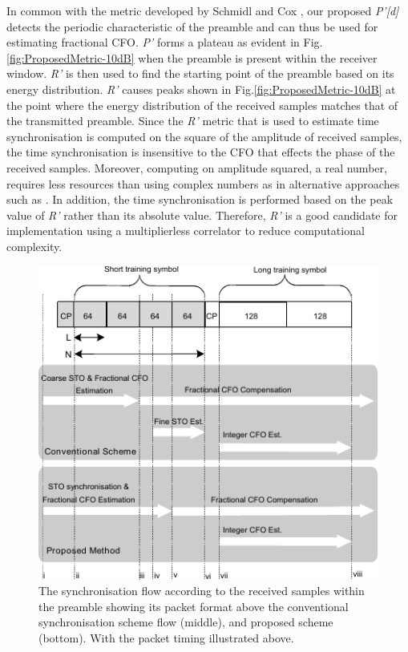 In common with the metric developed by Schmidl and Cox \cite{Schmidl1997}, our proposed \emph{P'[d]} detects the periodic characteristic of the preamble and can thus be used for estimating fractional CFO.
\emph{P'} forms a plateau as evident in Fig.\ref{fig:ProposedMetric-10dB} when the preamble is present within the receiver window.
\emph{R'} is then used to find the starting point of the preamble based on its energy distribution.
\emph{R'} causes peaks shown in Fig.\ref{fig:ProposedMetric-10dB} at the point where the energy distribution of the received samples matches that of the transmitted preamble.
Since the \emph{R'} metric that is used to estimate time synchronisation is computed on the square of the amplitude of received samples, the time synchronisation is insensitive to the CFO that effects the phase of the received samples.
Moreover, computing on amplitude squared, a real number, requires less resources than using complex numbers as in alternative approaches such as \cite{Kishore2006}.
In addition, the time synchronisation is performed based on the peak value of \emph{R'} rather than its absolute value.
Therefore, \emph{R'} is a good candidate for implementation using a multiplierless correlator to reduce computational complexity.
\begin{figure}
	\centerline{\includegraphics [width=1\columnwidth] {figures/SynFlow_IVMannotated.pdf}}
	\caption{The synchronisation flow according to the received samples within the preamble showing its packet format above the conventional synchronisation scheme flow (middle), and proposed scheme (bottom). With the packet timing illustrated above.}
	\label{fig:SyncFlow}
\end{figure}
